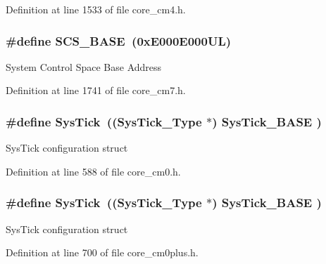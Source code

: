 Definition at line 1533 of file core\+\_\+cm4.\+h.

\subsubsection[{\texorpdfstring{S\+C\+S\+\_\+\+B\+A\+SE}{SCS_BASE}}]{\setlength{\rightskip}{0pt plus 5cm}\#define S\+C\+S\+\_\+\+B\+A\+SE~(0x\+E000\+E000\+U\+L)}\hypertarget{group___c_m_s_i_s__core__base_ga3c14ed93192c8d9143322bbf77ebf770}{}\label{group___c_m_s_i_s__core__base_ga3c14ed93192c8d9143322bbf77ebf770}
System Control Space Base Address 

Definition at line 1741 of file core\+\_\+cm7.\+h.

\subsubsection[{\texorpdfstring{Sys\+Tick}{SysTick}}]{\setlength{\rightskip}{0pt plus 5cm}\#define Sys\+Tick~(({\bf Sys\+Tick\+\_\+\+Type}   $\ast$)     {\bf Sys\+Tick\+\_\+\+B\+A\+SE}  )}\hypertarget{group___c_m_s_i_s__core__base_gacd96c53beeaff8f603fcda425eb295de}{}\label{group___c_m_s_i_s__core__base_gacd96c53beeaff8f603fcda425eb295de}
Sys\+Tick configuration struct 

Definition at line 588 of file core\+\_\+cm0.\+h.

\subsubsection[{\texorpdfstring{Sys\+Tick}{SysTick}}]{\setlength{\rightskip}{0pt plus 5cm}\#define Sys\+Tick~(({\bf Sys\+Tick\+\_\+\+Type}   $\ast$)     {\bf Sys\+Tick\+\_\+\+B\+A\+SE}  )}\hypertarget{group___c_m_s_i_s__core__base_gacd96c53beeaff8f603fcda425eb295de}{}\label{group___c_m_s_i_s__core__base_gacd96c53beeaff8f603fcda425eb295de}
Sys\+Tick configuration struct 

Definition at line 700 of file core\+\_\+cm0plus.\+h.

